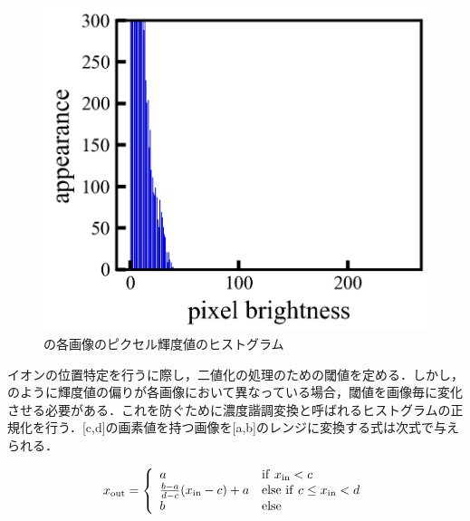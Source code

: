 \begin{figure}[h]
\begin{center}
\begin{minipage}{0.3\linewidth}
		\end{minipage}
		\begin{minipage}{0.3\linewidth}
			\includegraphics[width=0.98\columnwidth]{./theory/figure/5/hist_1.jpg}
		\end{minipage}
	\end{center}
	\caption{の各画像のピクセル輝度値のヒストグラム}
	\label{fig:hist}
\end{figure}

イオンの位置特定を行うに際し，二値化の処理のための閾値を定める．しかし，のように輝度値の偏りが各画像において異なっている場合，閾値を画像毎に変化させる必要がある．これを防ぐために濃度諧調変換と呼ばれるヒストグラムの正規化を行う．[c,d]の画素値を持つ画像を[a,b]のレンジに変換する式は次式で与えられる．

\large
\begin{align}\label{eq:GS_trans}
x_{\rm out} = 
\left\{ 
\begin{array}{ll}
	a & {\rm if} \ x_{\rm in} < c \\
	\frac{b-a}{d-c}(x_{\rm in}-c) + a & {\rm else \ if} \ c \leq x_{\rm in} < d \\
	b &{\rm else}
\end{array} \right.
\end{align}
\normalsize


